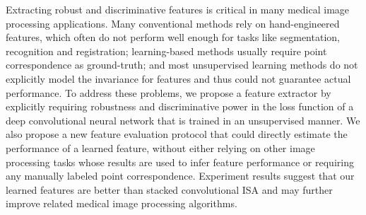 Extracting robust and discriminative features is critical in many medical
image processing applications. Many conventional methods rely on
hand-engineered features, which often do not perform well enough for tasks
like segmentation, recognition and registration; learning-based methods
usually require point correspondence as ground-truth; and most unsupervised
learning methods do not explicitly model the invariance for features and thus
could not guarantee actual performance.  To address these problems, we propose
a feature extractor by explicitly requiring robustness and discriminative
power in the loss function of a deep convolutional neural network that is
trained in an unsupervised manner. We also propose a new feature evaluation
protocol that could directly estimate the performance of a learned feature,
without either relying on other image processing tasks whose results are used
to infer feature performance or requiring any manually labeled point
correspondence. Experiment results suggest that our learned features are
better than stacked convolutional ISA and may further improve related medical
image processing algorithms.

